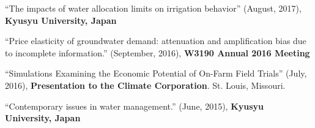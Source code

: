 \documentclass[10pt,margin,line]{res}
\newenvironment{list1}{
  \begin{list}{\ding{113}}{%
      \setlength{\itemsep}{0in}
      \setlength{\parsep}{0in} \setlength{\parskip}{0in}
      \setlength{\topsep}{0in} \setlength{\partopsep}{0in}
      \setlength{\leftmargin}{0.17in}}}{\end{list}}
\begin{document}
\begin{resume}
\begin{list1}
\vspace*{0.3cm}
\item[] ``The impacts of water allocation limits on irrigation behavior'' (August, 2017), \textbf{Kyusyu University, Japan} 
\vspace*{0.3cm}
\item[] ``Price elasticity of groundwater demand: attenuation and amplification bias due to incomplete information.'' (September, 2016), \textbf{W3190 Annual 2016 Meeting} 
\vspace*{0.3cm}
\item[] ``Simulations Examining the Economic Potential of On-Farm Field Trials'' (July, 2016), \textbf{Presentation to the Climate Corporation}.  St. Louis, Missouri.
\vspace*{0.3cm}
\item[] ``Contemporary issues in water management.'' (June, 2015), \textbf{Kyusyu University, Japan} 
\vspace*{0.3cm}
\end{list1}

 




\end{resume}
\end{document}
